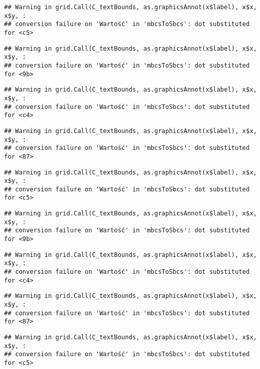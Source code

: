 \documentclass[
]{book}
\begin{document}
\begin{verbatim}
## Warning in grid.Call(C_textBounds, as.graphicsAnnot(x$label), x$x, x$y, :
## conversion failure on 'Wartość' in 'mbcsToSbcs': dot substituted for <c5>
\end{verbatim}

\begin{verbatim}
## Warning in grid.Call(C_textBounds, as.graphicsAnnot(x$label), x$x, x$y, :
## conversion failure on 'Wartość' in 'mbcsToSbcs': dot substituted for <9b>
\end{verbatim}

\begin{verbatim}
## Warning in grid.Call(C_textBounds, as.graphicsAnnot(x$label), x$x, x$y, :
## conversion failure on 'Wartość' in 'mbcsToSbcs': dot substituted for <c4>
\end{verbatim}

\begin{verbatim}
## Warning in grid.Call(C_textBounds, as.graphicsAnnot(x$label), x$x, x$y, :
## conversion failure on 'Wartość' in 'mbcsToSbcs': dot substituted for <87>
\end{verbatim}

\begin{verbatim}
## Warning in grid.Call(C_textBounds, as.graphicsAnnot(x$label), x$x, x$y, :
## conversion failure on 'Wartość' in 'mbcsToSbcs': dot substituted for <c5>
\end{verbatim}

\begin{verbatim}
## Warning in grid.Call(C_textBounds, as.graphicsAnnot(x$label), x$x, x$y, :
## conversion failure on 'Wartość' in 'mbcsToSbcs': dot substituted for <9b>
\end{verbatim}

\begin{verbatim}
## Warning in grid.Call(C_textBounds, as.graphicsAnnot(x$label), x$x, x$y, :
## conversion failure on 'Wartość' in 'mbcsToSbcs': dot substituted for <c4>
\end{verbatim}

\begin{verbatim}
## Warning in grid.Call(C_textBounds, as.graphicsAnnot(x$label), x$x, x$y, :
## conversion failure on 'Wartość' in 'mbcsToSbcs': dot substituted for <87>
\end{verbatim}

\begin{verbatim}
## Warning in grid.Call(C_textBounds, as.graphicsAnnot(x$label), x$x, x$y, :
## conversion failure on 'Wartość' in 'mbcsToSbcs': dot substituted for <c5>
\end{verbatim}
\end{document}
